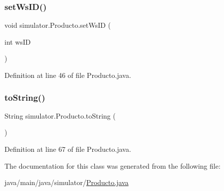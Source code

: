 \mbox{\label{classsimulator_1_1_producto_af777b058acf8120624ce58d1b5da26d1}} 
\subsubsection{\texorpdfstring{set\+Ws\+I\+D()}{setWsID()}}
{\footnotesize\ttfamily void simulator.\+Producto.\+set\+Ws\+ID (\begin{DoxyParamCaption}\item[{int}]{ws\+ID }\end{DoxyParamCaption})}



Definition at line 46 of file Producto.\+java.

\mbox{\label{classsimulator_1_1_producto_a31114900c2dcf40e36fbc4b6b55ce985}} 
\subsubsection{\texorpdfstring{to\+String()}{toString()}}
{\footnotesize\ttfamily String simulator.\+Producto.\+to\+String (\begin{DoxyParamCaption}{ }\end{DoxyParamCaption})}



Definition at line 67 of file Producto.\+java.



The documentation for this class was generated from the following file\+:\begin{DoxyCompactItemize}
\item 
java/main/java/simulator/\mbox{\hyperlink{_producto_8java}{Producto.\+java}}\end{DoxyCompactItemize}

